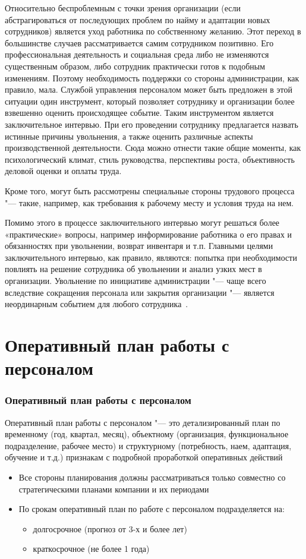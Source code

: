 \documentclass{../industrial-development}
\begin{document}
Относительно беспроблемным с точки зрения организации (если абстрагироваться от последующих проблем по найму и адаптации новых сотрудников) является уход работника по собственному желанию. Этот переход в большинстве случаев рассматривается самим сотрудником позитивно. Его профессиональная деятельность и социальная среда либо не изменяются существенным образом, либо сотрудник практически готов к подобным изменениям. Поэтому необходимость поддержки со стороны администрации, как правило, мала. Службой управления персоналом может быть предложен в этой ситуации один инструмент, который позволяет сотруднику и организации более взвешенно оценить происходящее событие. Таким инструментом является заключительное интервью. При его проведении сотруднику предлагается назвать истинные причины увольнения, а также оценить различные аспекты производственной деятельности. Сюда можно отнести такие общие моменты, как психологический климат, стиль руководства, перспективы роста, объективность деловой оценки и оплаты труда.

Кроме того, могут быть рассмотрены специальные стороны трудового процесса "--- такие, например, как требования к рабочему месту и условия труда на нем.

Помимо этого в процессе заключительного интервью могут решаться более «практические» вопросы, например информирование работника о его правах и обязанностях при увольнении, возврат инвентаря и т.п. Главными целями заключительного интервью, как правило, являются: попытка при необходимости повлиять на решение сотрудника об увольнении и анализ узких мест в организации.
Увольнение по инициативе администрации "--- чаще всего вследствие сокращения персонала или закрытия организации "--- является неординарным событием для любого сотрудника~\cite[с.~383--384]{Kibanov}.

\section{Оперативный план работы с персоналом}

\begin{frame} \frametitle{Оперативный план работы с персоналом}

\alert{Оперативный план работы с персоналом} "--- это детализированный план по временному (год, квартал, месяц), объектному (организация, функциональное подразделение, рабочее место) и структурному (потребность, наем, адаптация, обучение и т.д.) признакам с подробной проработкой оперативных действий

 \begin{itemize}
\item Все стороны планирования должны рассматриваться только совместно со стратегическими планами компании и их периодами
\item По срокам оперативный план по работе с персоналом подразделяется на:
  \begin{itemize}
	\item долгосрочное (прогноз от 3-х и более лет)
	\item краткосрочное (не более 1 года)
	  \end{itemize}
		  \end{itemize}
\end{frame}
\end{document}

